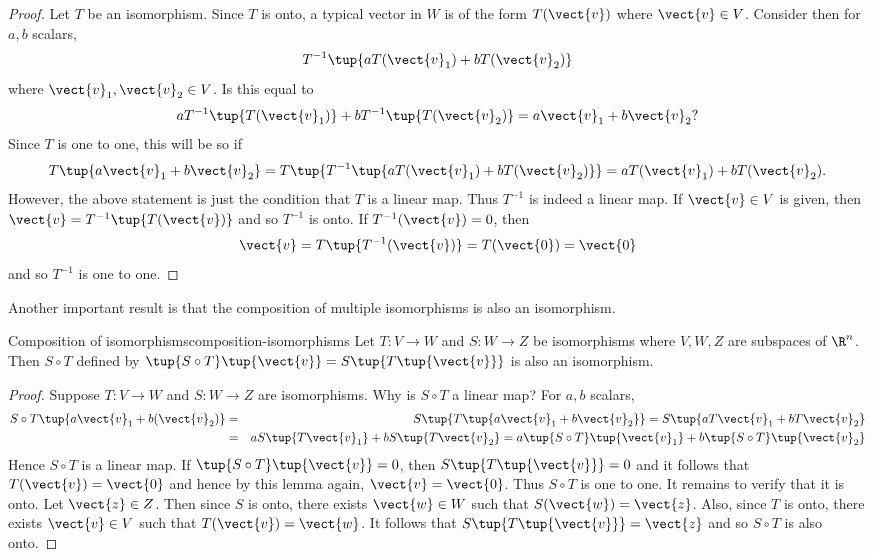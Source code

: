 \begin{proof} Let $T$ be an isomorphism.  Since $T$ is onto, a typical
vector in $W$ is of the form $T(\vect{v})$ where $\vect{v} \in V$. Consider then for $a,b$
scalars, 
\begin{equation*}
T^{-1}\tup{aT(\vect{v}_{1})+bT(\vect{v}_{2})}
\end{equation*}
where $\vect{v}_{1}, \vect{v}_2 \in V$. Is this equal to 
\begin{equation*}
aT^{-1}\tup{T (\vect{v}_{1})} +bT^{-1}\tup{T(\vect{v}_{2})} =a\vect{v}_{1}+b\vect{v}_{2}?
\end{equation*}
Since $T$ is one to one, this will be so if 
\begin{equation*}
T\tup{a\vect{v}_{1}+b\vect{v}_{2}} =T\tup{T^{-1}\tup{aT(\vect{v}_{1})+bT(\vect{v}_{2})}
} =aT(\vect{v}_{1})+bT(\vect{v}_{2}).
\end{equation*}
However, the above statement is just the condition that $T$ is a linear map.
Thus $T^{-1}$ is indeed a linear map. If $\vect{v} \in V$ is given, then $\vect{v}=T^{-1}\tup{T(\vect{v})} $ and so $T^{-1}$ is onto. If $T^{-1} (\vect{v})=0$, then 
\begin{equation*}
\vect{v}=T\tup{T^{-1}(\vect{v})} =T(\vect{0})=\vect{0}
\end{equation*}
and so $T^{-1}$ is one to one.
\end{proof}

Another important result is that the composition of multiple isomorphisms is also an isomorphism.

\begin{proposition}{Composition of isomorphisms}{composition-isomorphisms}
Let $T:V\rightarrow W$ and  $S:W\rightarrow Z$ be isomorphisms where $V,W,Z$ are subspaces of $\R^n$. Then $S\circ
T $ defined by $\tup{S\circ T} \tup{\vect{v} } = S\tup{
T\tup{\vect{v} } } $ is also an isomorphism.
\end{proposition}

\begin{proof}
Suppose $T:V\rightarrow W$ and  $S:W\rightarrow Z$ are isomorphisms. Why is $S\circ T$ a linear map?
For $a,b$ scalars,
\begin{eqnarray*}
S\circ T\tup{a\vect{v}_{1}+b(\vect{v}_{2})} 
&=& S\tup{T\tup{a\vect{v}_{1}+b\vect{v}_{2}} } =S\tup{aT\vect{v}_{1}+bT\vect{v}_{2}} \\
&=&aS\tup{T\vect{v}_{1}} +bS\tup{T\vect{v}_{2}} = a\tup{S\circ
T} \tup{\vect{v}_{1}} +b\tup{S\circ T} \tup{\vect{v}_{2}}
\end{eqnarray*}
Hence $S\circ T$ is a linear map. If $\tup{S\circ T} \tup{\vect{v} }
=0$, then $S\tup{T\tup{\vect{v} } } =0$ and it follows that $T(\vect{v})=\vect{0}$ and hence by this lemma again, $\vect{v}=\vect{0}$. Thus $S\circ
T $ is one to one. It remains to verify that it is onto. Let $\vect{z} \in Z$. Then
since $S$ is onto, there exists $\vect{w} \in W$ such that $S(\vect{w})=\vect{z}$. Also, since $T$
is onto, there exists $\vect{v}\in V$ such that $T(\vect{v})=\vect{w}$. It follows that $S\tup{
T\tup{\vect{v}} } =\vect{z}$ and so $S\circ T$ is also onto.
\end{proof}

